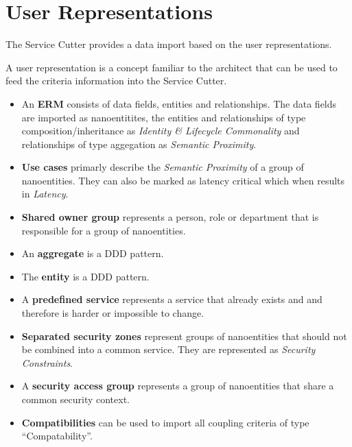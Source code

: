 


\section{User Representations}
\label{sec:dataImport}

The Service Cutter provides a data import based on the user representations.

A user representation is a concept familiar to the architect that can be used to feed the criteria information into the Service Cutter. 

\begin{itemize}
\item An \textbf{\gls{ERM}} consists of data fields, entities and relationships. The data fields are imported as nanoentitites, the entities and relationships of type composition/inheritance as\textit{ Identity \& Lifecycle Commonality} and relationships of type aggegation as \textit{Semantic Proximity}.
\item \textbf{Use cases} primarly describe the \textit{Semantic Proximity} of a group of nanoentities. They can also be marked as latency critical which when results in \textit{Latency}.
\item \textbf{Shared owner group} represents a person, role or department that is responsible for a group of nanoentities.
\item An \textbf{aggregate} is a \gls{DDD} pattern. 
\item The \textbf{entity} is a \gls{DDD} pattern.
\item A \textbf{predefined service} represents a service that already exists and and therefore is harder or impossible to change.
\item \textbf{Separated security zones} represent groups of nanoentities that should not be combined into a common service. They are represented as \textit{Security Constraints}.
\item A \textbf{security access group} represents a group of nanoentities that share a common security context.
\item \textbf{Compatibilities} can be used to import all coupling criteria of type \enquote{Compatability}.
\end{itemize}


